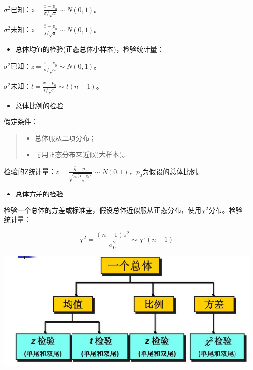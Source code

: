 \documentclass[]{ctexbook}
\providecommand{\tightlist}{%
  \setlength{\itemsep}{0pt}\setlength{\parskip}{0pt}}
\begin{document}
\(\sigma^2\)已知：\(z=\frac{\bar x-\mu_0}{\sigma/\sqrt{n}}\sim N(0,1)\)。

\(\sigma^2\)未知：\(z=\frac{\bar x-\mu_0}{s/\sqrt{n}}\sim N(0,1)\)。

\begin{itemize}
\tightlist
\item
  总体均值的检验(正态总体小样本)，检验统计量：
\end{itemize}

\(\sigma^2\)已知：\(z=\frac{\bar x-\mu_0}{\sigma/\sqrt{n}}\sim N(0,1)\)。

\(\sigma^2\)未知：\(t=\frac{\bar x-\mu_0}{s/\sqrt{n}}\sim t(n-1)\)。

\begin{itemize}
\tightlist
\item
  总体比例的检验
\end{itemize}

假定条件：

\begin{quote}
\begin{itemize}
\tightlist
\item
  总体服从二项分布；
\item
  可用正态分布来近似(大样本)。
\end{itemize}
\end{quote}

检验的Z统计量：\(z=\frac{\bar q-p_0}{\sqrt{\frac{p_0(1-p_0)}{n}}}\sim N(0,1)\)，\(p_0\)为假设的总体比例。

\begin{itemize}
\tightlist
\item
  总体方差的检验
\end{itemize}

检验一个总体的方差或标准差，假设总体近似服从正态分布，使用\(\chi^2\)分布。检验统计量：

\[\chi^2=\frac{(n-1)s^2}{\sigma_0^2}\sim \chi^2(n-1)\]

\includegraphics[width=1\linewidth,height=0.35\textheight]{fig/fig18}
\end{document}
